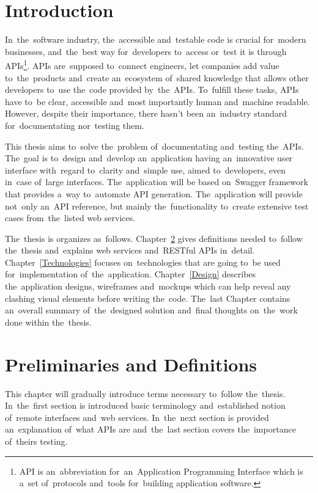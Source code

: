 

\chapter{Introduction}
In~the~software industry, the~accessible and~testable code is crucial for~modern
businesses, and~the~best way for~developers to~access or~test it is
through APIs\footnote{API is an~abbreviation for~an~Application Programming Interface which is a~set
of~protocols and~tools for~building application software.}. APIs are~supposed
to~connect engineers, let companies add value to~the~products and~create
an~ecosystem of~shared knowledge that allows other developers to~use the~code
provided by~the~APIs. To~fulfill these tasks, APIs have to~be clear, accessible
and~most importantly human and~machine readable. However, despite their
importance, there hasn't been an~industry standard for~documentating nor~testing
them.

This thesis aims to~solve the~problem of~documentating and~testing the~APIs.
The~goal is to~design and~develop an~application having an~innovative user
interface with~regard to~clarity and~simple use, aimed to~developers, even
in~case of~large interfaces. The~application will be based on~Swagger framework
that provides a~way to~automate API generation. The~application will provide
not~only an~API reference, but mainly the~functionality to~create extensive test
cases from~the~listed web services.


The~thesis is organizes as~follows. Chapter~\ref{Preliminaries} gives
definitions needed to~follow the~thesis and~explains web services and~RESTful
APIs in~detail. Chapter~\ref{Technologies} focuses on~technologies that are
going to~be used for~implementation of~the~application. Chapter~\ref{Design}
describes the~application designs, wireframes and~mockups which can help reveal
any clashing visual elements before writing the~code. The~last Chapter contains
an~overall summary of~the~designed solution and~final thoughts on~the~work done
within the~thesis.




\chapter{Preliminaries and Definitions}
\label{Preliminaries}
This chapter will gradually introduce terms necessary to~follow the~thesis.
In~the~first section is introduced basic terminology and~established notion
of~remote interfaces and~web services. In~the~next section is provided
an~explanation of~what APIs are and~the~last section covers the~importance
of~theirs testing.


